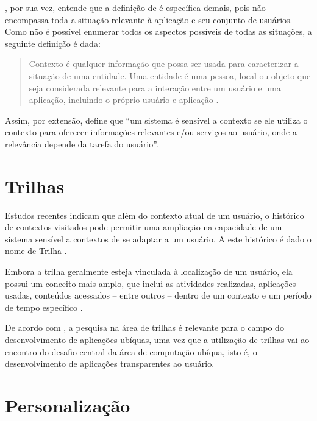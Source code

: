 , por sua vez, entende que a definição de  é específica demais, pois não encompassa toda a situação relevante à aplicação e seu conjunto de usuários. Como não é possível enumerar todos os aspectos possíveis de todas as situações, a seguinte definição é dada:

\begin{quotation}
Contexto é qualquer informação que possa ser usada para caracterizar a situação de uma entidade. Uma entidade é uma pessoa, local ou objeto que seja considerada relevante para a interação entre um usuário e uma aplicação, incluindo o próprio usuário e aplicação \cite{dey2001}.
\end{quotation}

Assim, por extensão,  define que ``um sistema é sensível a contexto se ele utiliza o contexto para oferecer informações relevantes e/ou serviços ao usuário, onde a relevância depende da tarefa do usuário''.


\section{Trilhas}
\label{sec:trilhas}

Estudos recentes indicam que além do contexto atual de um usuário, o histórico de contextos visitados pode permitir uma ampliação na capacidade de um sistema sensível a contextos de se adaptar a um usuário. A este histórico é dado o nome de Trilha \cite{silva09,driver08,clarke04}.

Embora a trilha geralmente esteja vinculada à localização de um usuário, ela possui um conceito mais amplo, que inclui as atividades realizadas, aplicações usadas, conteúdos acessados -- entre outros -- dentro de um contexto e um período de tempo específico \cite{silva09}.

De acordo com , a pesquisa na área de trilhas é relevante para o campo do desenvolvimento de aplicações ubíquas, uma vez que a utilização de trilhas vai ao encontro do desafio central da área de computação ubíqua, isto é, o desenvolvimento de aplicações transparentes ao usuário.


\section{Personalização}
\label{sec:personalizacao}

